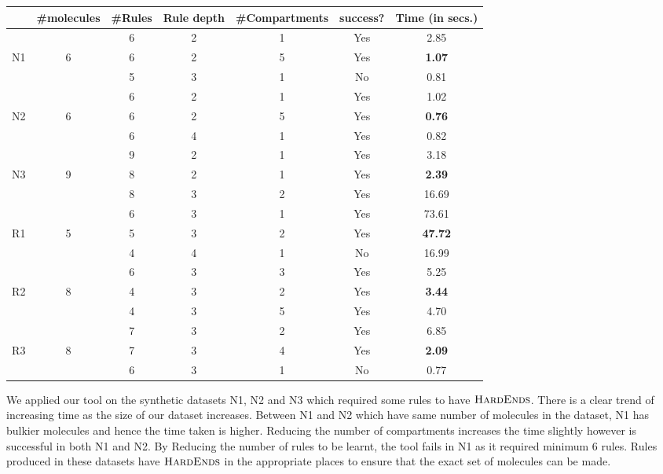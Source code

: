 \documentclass{llncs}
\begin{document}
\begin{table}
  \centering
  \begin{tabular}{|c|c|c|c|c|c|c|}\hline
     & \#molecules& \#Rules & Rule depth & \#Compartments & success? & Time (in secs.) 
          \\\hline
         &   & 6  & 2 & 1 & Yes &  2.85 \\\cline{3-7}
    N1   & 6 & 6  & 2 & 5 & Yes & {\bf 1.07}  \\\cline{3-7}
         &   & 5  & 3 & 1 & No & 0.81  \\\hline
         
         &   & 6  & 2 & 1 & Yes & 1.02  \\\cline{3-7}
    N2   & 6 & 6  & 2 & 5 & Yes & {\bf 0.76}  \\\cline{3-7}
         &   & 6  & 4 & 1 & Yes & 0.82 \\\hline
         
         &   & 9  & 2  & 1  & Yes & 3.18  \\\cline{3-7}
    N3   & 9 & 8  & 2 & 1 & Yes & {\bf 2.39}  \\\cline{3-7}
         &   & 8  & 3 & 2 & Yes  &  16.69 \\\hline
         
         &   & 6  & 3  & 1  & Yes & 73.61  \\\cline{3-7}
    R1   & 5 & 5  & 3 & 2 & Yes & {\bf 47.72}  \\\cline{3-7}
         &   & 4  & 4 & 1 & No  &  16.99 \\\hline
         
         &   & 6  & 3 & 3 & Yes &  5.25 \\\cline{3-7}
    R2   & 8 & 4  & 3 & 2 & Yes & {\bf 3.44}  \\\cline{3-7}
         &   & 4  & 3 & 5 & Yes  &  4.70 \\\hline
         
         &   & 7  & 3 & 2 & Yes &  6.85 \\\cline{3-7}
    R3   & 8 & 7  & 3 & 4 & Yes & {\bf 2.09}  \\\cline{3-7}
         &   & 6  & 3 & 1 & No  & 0.77  \\\hline
  \end{tabular}   
  \end{table}
 We applied our tool on the synthetic datasets N1, N2 and N3 which required some rules to have $\textsc{HardEnds}$. There is a clear trend of increasing time as the size of our dataset increases. Between N1 and N2 which have same number of molecules in the dataset, N1 has bulkier molecules and hence the time taken is higher. Reducing the number of compartments increases the time slightly however is successful in both N1 and N2. By Reducing the number of rules to be learnt, the tool fails in N1 as it required minimum 6 rules. Rules produced in these datasets have $\textsc{HardEnds}$ in the appropriate places to ensure that the exact set of molecules can be made.
\end{document}
